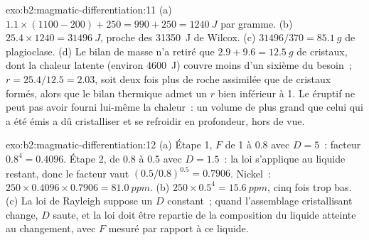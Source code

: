 \begin{solution}{exo:b2:magmatic-differentiation:11}
(a) $1.1\times(1100 - 200) + 250 = 990 + 250 = \qty{1240}{J}$ par gramme. (b)
$25.4\times1240 = \qty{31496}{J}$, proche des \qty{31350}{J} de Wilcox. (c)
$31496/370 = \qty{85.1}{g}$ de plagioclase. (d) Le bilan de masse n'a retiré que $2.9 +
9.6 = \qty{12.5}{g}$ de cristaux, dont la chaleur latente (environ \qty{4600}{J}) couvre moins
d'un sixième du besoin~; $r = 25.4/12.5 = 2.03$, soit deux fois plus de roche assimilée
que de cristaux formés, alors que le bilan thermique admet un $r$ bien inférieur à 1.
Le  éruptif ne peut pas avoir fourni lui-même la chaleur~: un volume de  plus grand
que celui qui a été émis a dû cristalliser et se refroidir en profondeur, hors de vue.
\end{solution}

\begin{solution}{exo:b2:magmatic-differentiation:12}
(a) Étape 1, $F$ de 1 à 0.8 avec $D = 5$~: facteur $0.8^{4} = 0.4096$. Étape 2,
de 0.8 à 0.5 avec $D = 1.5$~: la loi s'applique au liquide restant, donc le
facteur vaut $(0.5/0.8)^{0.5} = 0.7906$. Nickel~: $250\times0.4096\times0.7906 =
\qty{81.0}{ppm}$. (b) $250\times0.5^{4} = \qty{15.6}{ppm}$, cinq fois trop bas. (c)
La loi de Rayleigh suppose un $D$ constant~; quand l'assemblage cristallisant change,
$D$ saute, et la loi doit être repartie de la composition du liquide atteinte au
changement, avec $F$ mesuré par rapport à ce liquide.
\end{solution}

